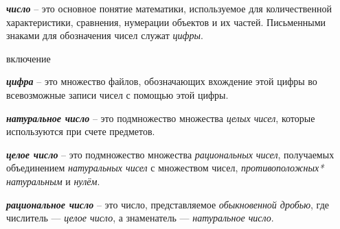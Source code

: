 \begin{SCn}
	
\end{SCn}

\textbf{\textit{число}} -- это основное понятие математики, используемое для количественной характеристики, сравнения, нумерации объектов и их частей. Письменными знаками для обозначения чисел служат \textit{цифры}.

\begin{SCn}

\begin{scnrelfromlist}{включение}
\end{scnrelfromlist}
\end{SCn}

\textbf{\textit{цифра}} -- это множество файлов, обозначающих вхождение этой цифры во всевозможные записи чисел с помощью этой цифры.

\begin{SCn}
\end{SCn}

\textbf{\textit{натуральное число}} -- это подмножество множества \textit{целых чисел}, которые используются при счете предметов.

\begin{SCn}
\end{SCn}

\textbf{\textit{целое число}} -- это подмножество множества \textit{рациональных чисел}, получаемых объединением \textit{натуральных чисел} с множеством чисел, \textit{противоположных* натуральным} и \textit{нулём}.

\begin{SCn}
\end{SCn}

\textbf{\textit{рациональное число}} -- это число, представляемое \textit{обыкновенной дробью}, где числитель — \textit{целое число}, а знаменатель — \textit{натуральное число}.

